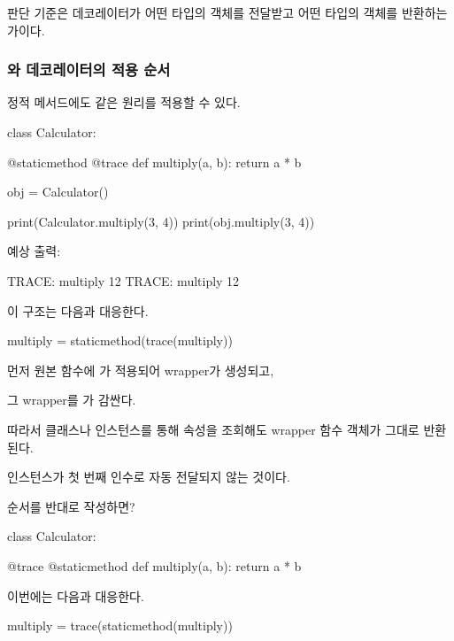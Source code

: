 판단 기준은 데코레이터가 어떤 타입의 객체를 전달받고 어떤 타입의 객체를 반환하는가이다.

\subsubsection{와 데코레이터의 적용 순서}

정적 메서드에도 같은 원리를 적용할 수 있다.

\begin{dhkcode}
class Calculator:

    @staticmethod
    @trace
    def multiply(a, b):
        return a * b


obj = Calculator()

print(Calculator.multiply(3, 4))
print(obj.multiply(3, 4))
\end{dhkcode}

예상 출력:

\begin{dhkzsh}
TRACE: multiply
12
TRACE: multiply
12
\end{dhkzsh}

이 구조는 다음과 대응한다.

\begin{dhkcode}
multiply = staticmethod(trace(multiply))
\end{dhkcode}

먼저 원본 함수에 가 적용되어 wrapper가 생성되고, 

그 wrapper를 가 감싼다.

따라서 클래스나 인스턴스를 통해 속성을 조회해도 wrapper 함수 객체가 그대로 반환된다.

인스턴스가 첫 번째 인수로 자동 전달되지 않는 것이다.

\begin{dhknote}
\begin{dhksmry}[centered]
순서를 반대로 작성하면?
\end{dhksmry}
\end{dhknote}

\begin{dhkcode}
class Calculator:

    @trace
    @staticmethod
    def multiply(a, b):
        return a * b
\end{dhkcode}

이번에는 다음과 대응한다.

\begin{dhkcode}
multiply = trace(staticmethod(multiply))
\end{dhkcode}

